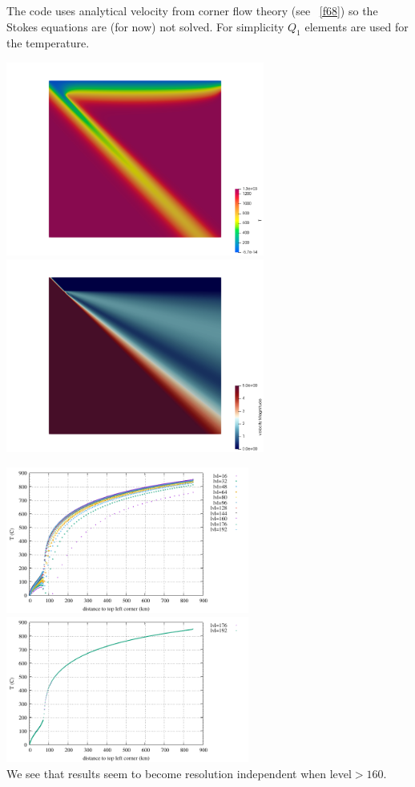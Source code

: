 The code uses analytical velocity from corner flow theory (see \stone~\ref{f68})
so the Stokes equations are (for now) not solved. For simplicity $Q_1$
elements are used for the  temperature.

\begin{center}
\includegraphics[width=8.5cm]{python_codes/fieldstone_149/results/temp}
\includegraphics[width=8.5cm]{python_codes/fieldstone_149/results/vel}
\end{center}

\begin{center}
\includegraphics[width=8cm]{python_codes/fieldstone_149/results/diagT.pdf}
\includegraphics[width=8cm]{python_codes/fieldstone_149/results/diagT2.pdf}\\
{\captionfont We see that results seem to become resolution independent
when level$>160$.} 
\end{center}


